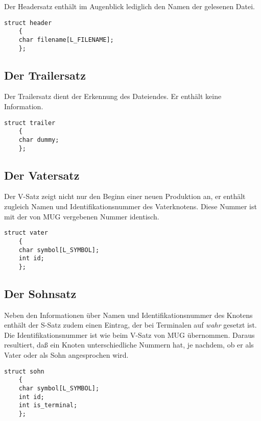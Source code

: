 Der Headersatz enth\"alt im Augenblick lediglich den Namen der gelesenen Datei.

\begin{small}\begin{verbatim}
struct header
	{
	char filename[L_FILENAME];
	};
\end{verbatim}\end{small}

\subsection{Der Trailersatz}

Der Trailersatz dient der Erkennung des Dateiendes. Er enth\"alt keine Information.

\begin{small}\begin{verbatim}
struct trailer
	{
	char dummy;
	};
\end{verbatim}\end{small}

\subsection{Der Vatersatz}

Der V-Satz zeigt nicht nur den Beginn einer neuen Produktion an, er enth\"alt zugleich Namen und Identifikationsnummer des Vaterknotens. Diese Nummer ist mit
der von MUG vergebenen Nummer identisch.

\begin{small}\begin{verbatim}
struct vater
	{
	char symbol[L_SYMBOL];
	int id;
	};
\end{verbatim}\end{small}

\subsection{Der Sohnsatz}

Neben den Informationen \"uber Namen und Identifikationsnummer des Knotens enth\"alt der S-Satz zudem einen Eintrag, der bei Terminalen auf {\it wahr} gesetzt
ist. Die Identifikationsnummer ist wie beim V-Satz von MUG \"ubernommen. Daraus resultiert, da\ss{} ein Knoten unterschiedliche Nummern hat, je nachdem, ob er
als Vater oder als Sohn angesprochen wird.

\begin{small}\begin{verbatim}
struct sohn
	{
	char symbol[L_SYMBOL];
	int id;
	int is_terminal;
	};
\end{verbatim}\end{small}

